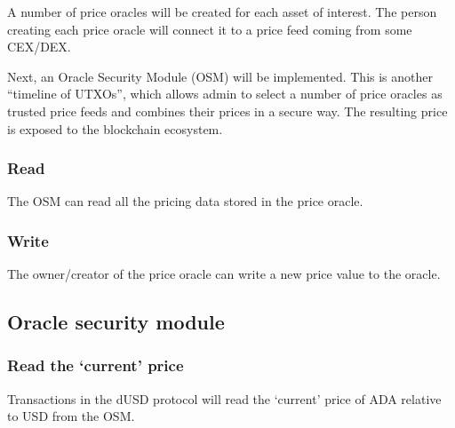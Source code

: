 \documentclass{article} %
\begin{document}
A number of price oracles will be created for each asset of interest.  The
person creating each price oracle will connect it to a price feed coming from
some CEX/DEX.

Next, an Oracle Security Module (OSM) will be implemented.
This is another ``timeline of UTXOs'', which allows admin to select a number of
price oracles as trusted price feeds and combines their prices in a secure way.
The resulting price is exposed to the blockchain ecosystem.

\subsubsection{Read}

The OSM can read all the pricing data stored in the price oracle.

\subsubsection{Write}

The owner/creator of the price oracle can write a new price value to the oracle.

\subsection{Oracle security module}

\subsubsection{Read the `current' price}


Transactions in the dUSD protocol will read the `current' price of ADA relative
to USD from the OSM.
\end{document}
